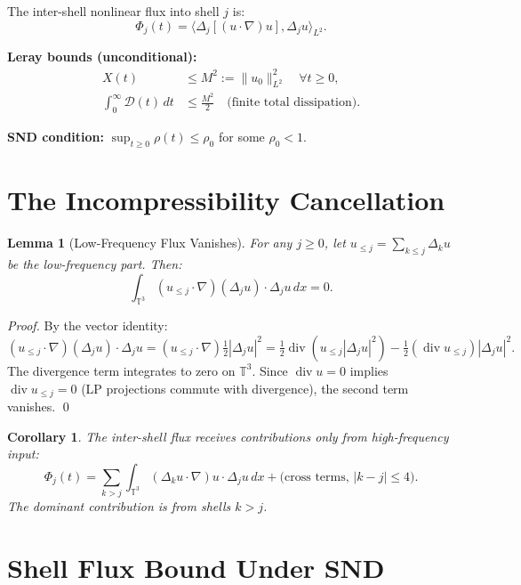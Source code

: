 \documentclass[11pt]{article}
\newtheorem{lemma}[theorem]{Lemma}
\newtheorem{corollary}[theorem]{Corollary}
\begin{document}
The inter-shell nonlinear flux into shell $j$ is:
\[
\Phi_j(t) = \langle \Delta_j[(u\cdot\nabla)u], \Delta_j u\rangle_{L^2}.
\]

\textbf{Leray bounds (unconditional):}
\begin{align}
X(t) &\leq M^2 := \|u_0\|_{L^2}^2 \quad\forall t\geq 0, \label{eq:L1}\tag{L1}\\
\int_0^\infty \mathcal{D}(t)\,dt &\leq \frac{M^2}{2} \quad\text{(finite total dissipation).}\label{eq:L2}\tag{L2}
\end{align}

\textbf{SND condition:} $\sup_{t\geq 0}\rho(t) \leq \rho_0$ for some $\rho_0 < 1$.

\section{The Incompressibility Cancellation}

\begin{lemma}[Low-Frequency Flux Vanishes]\label{lem:cancel}
For any $j\geq 0$, let $u_{\leq j} = \sum_{k\leq j}\Delta_k u$
be the low-frequency part. Then:
\[
\int_{\mathbb{T}^3} (u_{\leq j}\cdot\nabla)(\Delta_j u)\cdot \Delta_j u\,dx = 0.
\]
\end{lemma}

\begin{proof}
By the vector identity:
\[
(u_{\leq j}\cdot\nabla)(\Delta_j u)\cdot\Delta_j u
= (u_{\leq j}\cdot\nabla)\tfrac{1}{2}|\Delta_j u|^2
= \tfrac{1}{2}\operatorname{div}(u_{\leq j}|\Delta_j u|^2)
  - \tfrac{1}{2}(\operatorname{div}u_{\leq j})|\Delta_j u|^2.
\]
The divergence term integrates to zero on $\mathbb{T}^3$.
Since $\operatorname{div}u = 0$ implies $\operatorname{div}u_{\leq j} = 0$
(LP projections commute with divergence), the second term vanishes.
\qed
\end{proof}

\begin{corollary}\label{cor:hf}
The inter-shell flux receives contributions only from high-frequency input:
\[
\Phi_j(t) = \sum_{k > j} \int_{\mathbb{T}^3}
(\Delta_k u\cdot\nabla)u\cdot\Delta_j u\,dx + \text{(cross terms, }|k-j|\leq 4\text{)}.
\]
The dominant contribution is from shells $k > j$.
\end{corollary}

\section{Shell Flux Bound Under SND}
\end{document}
